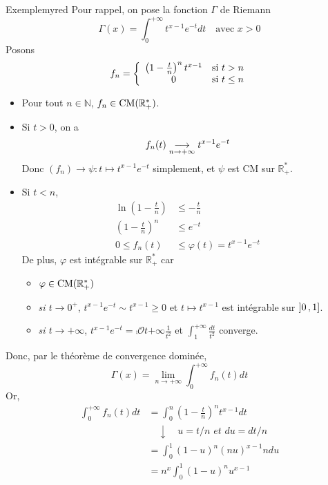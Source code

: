     \begin{omed}{Exemple}{myred}
        Pour rappel, on pose la fonction $\Gamma$ de Riemann 
        \[ \Gamma(x) = \int_{0}^{+\infty} t^{x-1} e^{-t}dt \quad \text{avec } x > 0 \]   
        Posons 
        \[ f_n = \sisi{\left( 1 - \frac{t}{n} \right)^n t^{x-1}}{t > n}{0}{t \leq n} \]   
        \begin{itemize}
            \item Pour tout $n \in \mathbb{N}$, $f_n \in \operatorname{CM}(\mathbb{R}^*_+)$.
            \item Si $t > 0$, on a 
            \[ f_n(t) \underset{n \rightarrow +\infty}{\longrightarrow} t^{x-1} e^{-t} \]   
            Donc $(f_n) \to \psi : t \mapsto t^{x-1}e^{-t}$ simplement, et $\psi$ est CM sur $\mathbb{R^*_+}$.
            \item Si $t < n$, 
            \begin{align*}
                \ln\left( 1 - \frac{t}{n} \right) &\leq - \frac{t}{n} \\
                \left( 1 - \frac{t}{n} \right)^n &\leq e^{-t} \\
                0 \leq f_n(t) &\leq \varphi(t) = t^{x-1}e^{-t}
            \end{align*}
            De plus, $\varphi$ est intégrable sur $\mathbb{R}^*_+$ car 
            \begin{itemize}
                \item $\varphi \in \operatorname{CM}(\mathbb{R}^*_+)$
                \item \textit{si $t \to 0^+$}, $t^{x-1}e^{-t} \sim t^{x-1} \geq 0$ et $t \mapsto t^{x-1}$ est intégrable sur $\left] 0 \, , 1 \right]$.
                \item \textit{si $t \to +\infty$}, $t^{x-1}e^{-t} = \comp{\mathcal{O}}{t}{+\infty}{\frac{1}{t^2}}$ et $\int_{1}^{+\infty} \frac{dt}{t^2}$ converge.
            \end{itemize}
        \end{itemize}
        Donc, par le théorème de convergence dominée, 
        \[ \Gamma(x) = \lim_{n \to +\infty} \int_{0}^{+\infty} f_n(t)dt \]   
        Or,
        \begin{align*}
            \int_{0}^{+\infty} f_n(t)dt 
            &= \int_{0}^{n} \left( 1 - \frac{t}{n} \right)^n t^{x-1} dt \\
            &\quad \downarrow \quad u = t / n \textit{ et } du = dt / n \\
            &= \int_{0}^{1} (1-u)^n (nu)^{x-1} n du \\
            &= n^x \int_{0}^{1} (1-u)^n u^{x-1} \\

\end{align*}
\end{omed}

